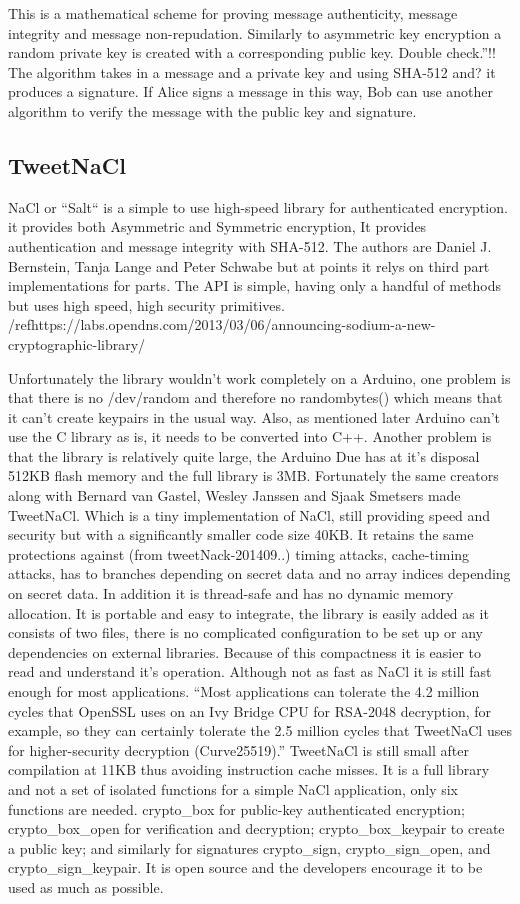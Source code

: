 This is a mathematical scheme for proving message authenticity, message integrity and message non-repudation. Similarly to asymmetric key encryption a random private key is created with a corresponding public key. Double check.''!! The algorithm takes in a message and a private key and using SHA-512 and? it produces a signature. If Alice signs a message in this way, Bob can use another algorithm to verify the message with the public key and signature.


\subsection{TweetNaCl}

NaCl or ``Salt`` is a simple to use high-speed library for authenticated encryption. it provides both Asymmetric and Symmetric encryption, It provides authentication and message integrity with SHA-512. The authors are Daniel J. Bernstein, Tanja Lange and Peter Schwabe but at points it relys on third part implementations for parts. The API is simple, having only a handful of methods but uses high speed, high security primitives.
/ref{https://labs.opendns.com/2013/03/06/announcing-sodium-a-new-cryptographic-library/}

Unfortunately the library wouldn't work completely on a Arduino, one problem is that there is no /dev/random and therefore no randombytes() which means that it can't create keypairs in the usual way.
Also, as mentioned later Arduino can't use the C library as is, it needs to be converted into C++. 
Another problem is that the library is relatively quite large, the Arduino Due has at it's disposal 512KB flash memory and the full library is 3MB. Fortunately the same creators along with Bernard van Gastel, Wesley Janssen and Sjaak Smetsers made TweetNaCl. Which is a tiny implementation of NaCl, still providing speed and security but with a significantly smaller code size 40KB. It retains the same protections against (from tweetNack-201409..) timing attacks, cache-timing attacks, has to branches depending on secret data and no array indices depending on secret data. In addition it is thread-safe and has no dynamic memory allocation. It is portable and easy to integrate, the library is easily added as it consists of two files, there is no complicated configuration to be set up or any dependencies on external libraries. Because of this compactness it is easier to read and understand it's operation. Although not as fast as NaCl it is still fast enough for most applications. ``Most applications can tolerate the 4.2 million cycles that OpenSSL uses
on an Ivy Bridge CPU for RSA-2048 decryption, for example, so they can certainly tolerate
the 2.5 million cycles that TweetNaCl uses for higher-security decryption (Curve25519).''
TweetNaCl is still small after compilation at 11KB thus avoiding instruction cache misses. It is a full library and not a set of isolated functions for a simple NaCl application, only six functions are needed. crypto\_box for public-key authenticated encryption; crypto\_box\_open for verification and decryption; crypto\_box\_keypair to create a public key; and similarly for signatures crypto\_sign, crypto\_sign\_open, and crypto\_sign\_keypair. It is open source and the developers encourage it to be used as much as possible. 

